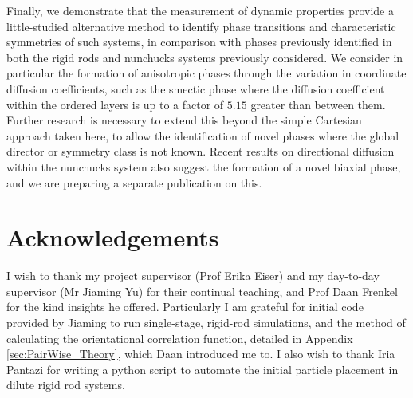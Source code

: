 \documentclass[11pt, a4paper]{article} %
\providecommand{\DIFadd}[1]{{\protect\color{blue}\uwave{#1}}} %
\providecommand{\DIFaddbegin}{} %
\providecommand{\DIFaddend}{} %
\begin{document}
Finally, we demonstrate that the measurement of dynamic properties provide a little-studied alternative method to identify phase transitions and characteristic symmetries of such systems, in comparison with phases previously identified in both the rigid rods and nunchucks systems previously considered. We consider in particular the formation of anisotropic phases through the variation in coordinate diffusion coefficients, such as \DIFaddbegin \DIFadd{in }\DIFaddend the smectic phase where the diffusion coefficient within the ordered layers is up to a factor of $5.15$ greater than between them. Further research is necessary to extend this beyond the simple Cartesian approach taken here, to allow the identification of novel phases where the global director or symmetry class is not known. Recent results on directional diffusion within the nunchucks system also suggest the formation of a novel biaxial phase, and we are preparing a separate publication on this.

\DIFaddbegin 

\DIFaddend \section*{Acknowledgements}
I wish to thank my project supervisor (Prof Erika Eiser) and my day-to-day supervisor (Mr Jiaming Yu) for their continual teaching, and Prof Daan Frenkel for the kind insights he offered. Particularly I am grateful for initial code provided by Jiaming to run single-stage, rigid-rod simulations, and the method of calculating the orientational correlation function, detailed in Appendix \ref{sec:PairWise_Theory}, which Daan introduced me to. I also wish to thank Iria Pantazi for writing a python script to automate the initial particle placement in dilute rigid rod systems.

\printbibliography
\end{document}
